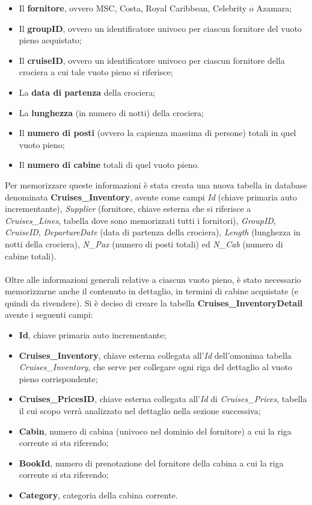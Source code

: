 \begin{itemize}
	\item Il \textbf{fornitore}, ovvero MSC, Costa, Royal Caribbean, Celebrity o Azamara;
	\item Il \textbf{groupID}, ovvero un identificatore univoco per ciascun fornitore del vuoto pieno acquistato;
	\item Il \textbf{cruiseID}, ovvero un identificatore univoco per ciascun fornitore della crociera a cui tale vuoto pieno si riferisce;
	\item La \textbf{data di partenza} della crociera;
	\item La \textbf{lunghezza} (in numero di notti) della crociera;
	\item Il \textbf{numero di posti} (ovvero la capienza massima di persone) totali in quel vuoto pieno;
	\item Il \textbf{numero di cabine} totali di quel vuoto pieno.
\end{itemize}
Per memorizzare queste informazioni è stata creata una nuova tabella in database denominata \textbf{Cruises\_Inventory}, avente come campi \textit{Id} (chiave primaria auto incrementante), \textit{Supplier} (fornitore, chiave esterna che si riferisce a \textit{Cruises\_Lines}, tabella dove sono memorizzati tutti i fornitori), \textit{GroupID}, \textit{CruiseID}, \textit{DepartureDate} (data di partenza della crociera), \textit{Length} (lunghezza in notti della crociera), \textit{N\_Pax} (numero di posti totali) ed \textit{N\_Cab} (numero di cabine totali).\\
\\
Oltre alle informazioni generali relative a ciascun vuoto pieno, è stato necessario memorizzarne anche il contenuto in dettaglio, in termini di cabine acquistate (e quindi da rivendere). Si è deciso di creare la tabella \textbf{Cruises\_InventoryDetail} avente i seguenti campi:
\begin{itemize}
	\item \textbf{Id}, chiave primaria auto incrementante;
	\item \textbf{Cruises\_Inventory}, chiave esterna collegata all'\textit{Id} dell'omonima tabella \textit{Cruises\_Inventory}, che serve per collegare ogni riga del dettaglio al vuoto pieno corrispondente;
	\item \textbf{Cruises\_PricesID}, chiave esterna collegata all'\textit{Id} di \textit{Cruises\_Prices}, tabella il cui scopo verrà analizzato nel dettaglio nella sezione successiva;
	\item \textbf{Cabin}, numero di cabina (univoco nel dominio del fornitore) a cui la riga corrente si sta riferendo;
	\item \textbf{BookId}, numero di prenotazione del fornitore della cabina a cui la riga corrente si sta riferendo;
	\item \textbf{Category}, categoria della cabina corrente.
\end{itemize}
